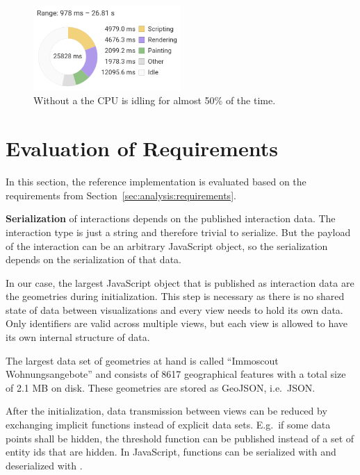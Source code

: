 \begin{figure}[h]
  \centering
  \includegraphics[width=0.5\textwidth]{figures/evaluation/performance/profiles/landkreise_geo_only/summary}
  \caption{
    Without a \tmap{} the CPU is idling for almost 50\% of the time.
  }\label{fig:evaluation:performance:profiling:landkreise_both:summary}
\end{figure}



\section{Evaluation of Requirements}\label{sec:evaluation:requirements}
In this section, the reference implementation is evaluated based on the requirements from Section~\ref{sec:analysis:requirements}.

\textbf{Serialization} of interactions depends on the published interaction data.
The interaction type is just a string and therefore trivial to serialize.
But the payload of the interaction can be an arbitrary JavaScript object, so the serialization depends on the serialization of that data.

In our case, the largest JavaScript object that is published as interaction data are the geometries during initialization.
This step is necessary as there is no shared state of data between visualizations and every view needs to hold its own data.
Only identifiers are valid across multiple views, but each view is allowed to have its own internal structure of data.

The largest data set of geometries at hand is called ``Immoscout Wohnungsangebote'' and consists of 8617 geographical features with a total size of 2.1 MB on disk.
These geometries are stored as GeoJSON, i.e.\ JSON.

After the initialization, data transmission between views can be reduced by exchanging implicit functions instead of explicit data sets.
E.g.\ if some data points shall be hidden, the threshold function can be published instead of a set of entity ids that are hidden.
In JavaScript, functions can be serialized with  and deserialized with .


